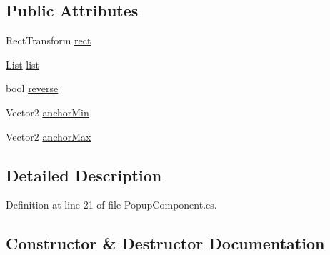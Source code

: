 \subsection*{Public Attributes}
\begin{DoxyCompactItemize}
\item 
Rect\+Transform \hyperlink{class_unity_engine_1_1_u_i_1_1_windows_1_1_components_1_1_popup_component_1_1_state_ae4c102dfc5ff08b49b9952cfb71754a2}{rect}
\item 
\hyperlink{class_unity_engine_1_1_u_i_1_1_windows_1_1_components_1_1_list}{List} \hyperlink{class_unity_engine_1_1_u_i_1_1_windows_1_1_components_1_1_popup_component_1_1_state_a22106fe9140162c4797486e597f839ca}{list}
\item 
bool \hyperlink{class_unity_engine_1_1_u_i_1_1_windows_1_1_components_1_1_popup_component_1_1_state_a0bc1cd458984d40a301106bcd400205f}{reverse}
\item 
Vector2 \hyperlink{class_unity_engine_1_1_u_i_1_1_windows_1_1_components_1_1_popup_component_1_1_state_a6643c883830739148a721bc1d2eaaee5}{anchor\+Min}
\item 
Vector2 \hyperlink{class_unity_engine_1_1_u_i_1_1_windows_1_1_components_1_1_popup_component_1_1_state_ab854c06e92c1619130d5ae0ee0f9d89e}{anchor\+Max}
\end{DoxyCompactItemize}


\subsection{Detailed Description}


Definition at line 21 of file Popup\+Component.\+cs.



\subsection{Constructor \& Destructor Documentation}
\hypertarget{class_unity_engine_1_1_u_i_1_1_windows_1_1_components_1_1_popup_component_1_1_state_aaca310566e470c2aa8ebd8892c62539d}{}
